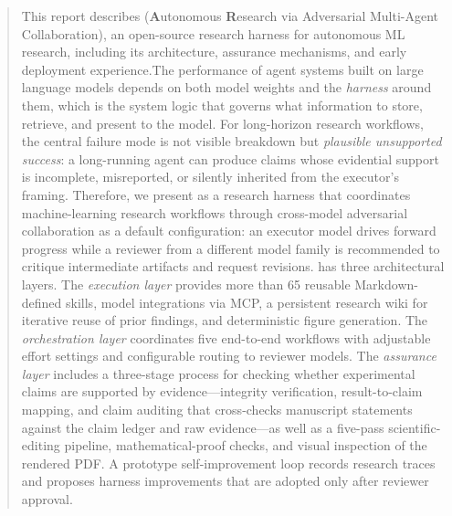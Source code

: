 \begin{abstract}
This report describes \aris{}(\textbf{A}utonomous \textbf{R}esearch via Adversarial Multi-Agent Collaboration), an open-source research harness for autonomous ML research, including its architecture, assurance mechanisms, and early deployment experience.The performance of agent systems built on large language models depends on both model weights and the \emph{harness} around them, which is the system logic that governs what information to store, retrieve, and present to the model.
For long-horizon research workflows, the central failure mode is not visible breakdown but \emph{plausible unsupported success}: a long-running agent can produce claims whose evidential support is incomplete, misreported, or silently inherited from the executor's framing.
Therefore, we present \aris{} as a research harness that coordinates machine-learning research workflows through cross-model adversarial collaboration as a default configuration: an executor model drives forward progress while a reviewer from a different model family is recommended to critique intermediate artifacts and request revisions.
\aris{} has three architectural layers.
The \emph{execution layer} provides more than 65 reusable Markdown-defined skills, model integrations via MCP, a persistent research wiki for iterative reuse of prior findings, and deterministic figure generation.
The \emph{orchestration layer} coordinates five end-to-end workflows with adjustable effort settings and configurable routing to reviewer models.
The \emph{assurance layer} includes a three-stage process for checking whether experimental claims are supported by evidence—integrity verification, result-to-claim mapping, and claim auditing that cross-checks manuscript statements against the claim ledger and raw evidence—as well as a five-pass scientific-editing pipeline, mathematical-proof checks, and visual inspection of the rendered PDF.
A prototype self-improvement loop records research traces and proposes harness improvements that are adopted only after reviewer approval.

\end{abstract}

